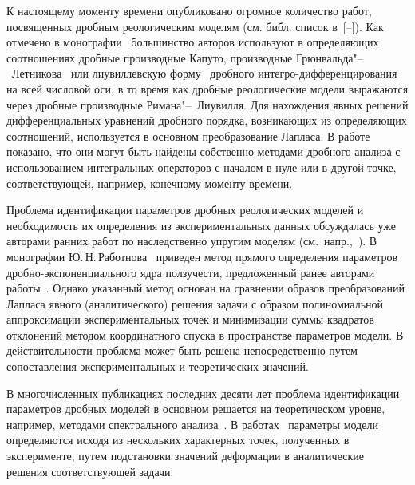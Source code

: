 К настоящему моменту времени опубликовано огромное количество работ, посвященных дробным реологическим моделям (см. библ. список в~[--]). Как отмечено в монографии~\cite[с.~443]{K-S-T} большинство авторов используют в определяющих соотношениях дробные производные Капуто, производные Грюнвальда"--~Летникова~\cite{Schmidt} или лиувиллевскую форму~\cite{Lewandowski} дробного интегро-дифференцирования на всей числовой оси, в то время как дробные реологические модели выражаются через дробные производные Римана"--~Лиувилля. Для нахождения явных решений дифференциальных уравнений дробного порядка, возникающих из определяющих соотношений, используется в основном преобразование Лапласа. В работе~\cite{OgoRadUng16} показано, что они могут быть найдены собственно методами дробного анализа с использованием интегральных операторов с началом в нуле или в другой точке, соответствующей, например, конечному моменту времени.

Проблема идентификации параметров дробных реологических моделей и необходимость их определения  из экспериментальных данных обсуждалась уже авторами ранних работ по наследственно упругим моделям (см.~напр.,~\cite{Gemant1936}). В монографии Ю.\,Н.\,Работнова~\cite[с.~86]{Rabotnov1977} приведен метод прямого определения параметров дробно-экспоненциального ядра ползучести, предложенный ранее авторами работы~\cite{Zvonov1968}. Однако указанный метод основан на сравнении образов преобразований Лапласа явного (аналитического) решения задачи с образом полиномиальной аппроксимации экспериментальных точек и минимизации суммы квадратов отклонений методом координатного спуска в пространстве параметров модели. В действительности проблема может быть решена непосредственно путем сопоставления экспериментальных и теоретических значений.

В многочисленных публикациях последних десяти лет проблема идентификации параметров дробных моделей в основном решается на теоретическом уровне, например, методами спектрального анализа~\cite{Vasques}. В работах~\cite{Erohin2015,Erohin_Disser} параметры модели определяются исходя из нескольких характерных точек, полученных в эксперименте, путем подстановки значений деформации в аналитические решения соответствующей задачи.

\smallskip


